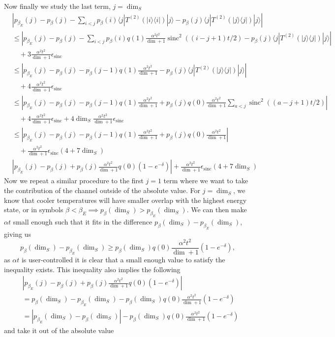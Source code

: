 \documentclass{article}
\newcommand{\ket}[1]{|#1\rangle}
\newcommand{\bra}[1]{\langle #1|}
\newcommand{\ketbra}[2]{| #1\rangle\! \langle #2|}
\newcommand{\abs}[1]{\left| #1 \right|}
\DeclareMathOperator{\sinc}{sinc}
\begin{document}
Now finally we study the last term, $j = \dim_S$
\begin{align}
    &\left| p_{\beta_E}(j) - p_{\beta}(j) - \sum_{i < j} p_{\beta}(i) \bra{j} T^{(2)}(\ketbra{i}{i}) \ket{j} - p_{\beta}(j) \bra{j} T^{(2)}(\ketbra{j}{j}) \ket{j} \right| \\
    &\leq \left| p_{\beta_E}(j) - p_{\beta}(j) - \sum_{i < j} p_{\beta}(i) q(1) \frac{\alpha^2 t^2}{\dim + 1} \sinc^2((i - j + 1)t/2) - p_{\beta}(j) \bra{j} T^{(2)}(\ketbra{j}{j}) \ket{j} \right| \nonumber \\
    &\quad + 3 \frac{\alpha^2 t^2}{\dim + 1} \epsilon_{\sinc} \\
    &\leq \left| p_{\beta_E}(j) - p_{\beta}(j) - p_{\beta}(j-1) q(1) \frac{\alpha^2 t^2}{\dim + 1} - p_{\beta}(j) \bra{j} T^{(2)}(\ketbra{j}{j}) \ket{j} \right| \nonumber \\
    &\quad + 4 \frac{\alpha^2 t^2}{\dim + 1} \epsilon_{\sinc} \\
    &\leq \left| p_{\beta_E}(j) - p_{\beta}(j) - p_{\beta}(j-1) q(1) \frac{\alpha^2 t^2}{\dim + 1} + p_{\beta}(j) q(0) \frac{\alpha^2 t^2}{\dim + 1} \sum_{a < j} \sinc^2((a - j + 1)t/2) \right| \nonumber \\
    &\quad + 4 \frac{\alpha^2 t^2}{\dim + 1} \epsilon_{\sinc} + 4 \dim_S \frac{\alpha^2 t^2}{\dim + 1} \epsilon_{\sinc} \\
    &\leq \left| p_{\beta_E}(j) - p_{\beta}(j) - p_{\beta}(j-1) q(1) \frac{\alpha^2 t^2}{\dim + 1} + p_{\beta}(j) q(0) \frac{\alpha^2 t^2}{\dim + 1} \right| \nonumber \\
    &\quad + \frac{\alpha^2 t^2}{\dim + 1} \epsilon_{\sinc} (4 + 7 \dim_S) \\
    &\left| p_{\beta_E}(j) - p_{\beta}(j) + p_{\beta}(j) \frac{\alpha^2 t^2}{\dim + 1}  q(0)(1 - e^{-\delta}) \right| + \frac{\alpha^2 t^2}{\dim + 1} \epsilon_{\sinc} (4 + 7 \dim_S)
\end{align}
Now we repeat a similar procedure to the first $j = 1$ term where we want to take the contribution of the channel outside of the absolute value. For $j = \dim_S$, we know that cooler temperatures will have smaller overlap with the highest energy state, or in symbols $\beta < \beta_E \implies p_{\beta}(\dim_S) > p_{\beta_E}(\dim_S)$. We can then make $\alpha t$ small enough such that it fits in the difference $p_{\beta}(\dim_S) - p_{\beta_E}(\dim_S)$, giving us
$$
p_{\beta}(\dim_S) - p_{\beta_E}(\dim_S) \geq p_{\beta} (\dim_S) q(0) \frac{\alpha^2 t^2}{\dim + 1} (1 - e^{-\delta}),
$$
as $\alpha t$ is user-controlled it is clear that a small enough value to satisfy the inequality exists. This inequality also implies the following
\begin{align}
    &\left| p_{\beta_E}(j) - p_{\beta}(j) + p_{\beta}(j) \frac{\alpha^2 t^2}{\dim + 1}  q(0)(1 - e^{-\delta}) \right| \\
    &= p_{\beta}(\dim_S) - p_{\beta_E}(\dim_S) - p_{\beta}(\dim_S) q(0) \frac{\alpha^2 t^2}{\dim + 1}(1 - e^{-\delta}) \\
    &= \abs{p_{\beta_E}(\dim_S) - p_{\beta}(\dim_S)} - p_{\beta}(\dim_S) q(0) \frac{\alpha^2 t^2}{\dim + 1}(1 - e^{-\delta})
\end{align}
and take it out of the absolute value
\end{document}
